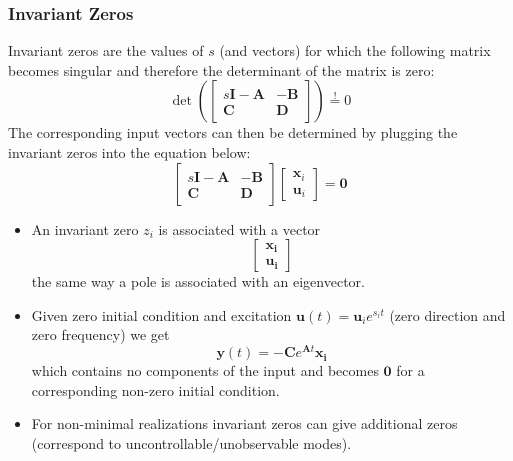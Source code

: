\subsubsection{Invariant Zeros}

Invariant zeros are the values of $s$ (and vectors) for which the following matrix becomes singular and therefore the determinant of the matrix is zero:
\begin{equation*}
    \det \left(\begin{bmatrix}
            s\mathbf{I}-\mathbf{A} & -\mathbf{B} \\
            \mathbf{C}             & \mathbf{D}
        \end{bmatrix}\right) \overset{!}{=}0
\end{equation*}
The corresponding input vectors can then be determined by plugging the invariant zeros into the equation below:
\begin{equation*}
    \begin{bmatrix}
        s\mathbf{I}-\mathbf{A} & -\mathbf{B} \\
        \mathbf{C}             & \mathbf{D}
    \end{bmatrix}
    \begin{bmatrix}
        \mathbf{x}_i \\
        \mathbf{u}_i
    \end{bmatrix}=\mathbf{0}
\end{equation*}


\begin{itemize}
    \item An invariant zero $z_i$ is associated with a vector
          \begin{equation*}
              \begin{bmatrix}
                  \mathbf{x_i} \\
                  \mathbf{u_i}
              \end{bmatrix}
          \end{equation*}
          the same way a pole is associated with an eigenvector.
    \item Given zero initial condition and excitation $\mathbf{u}(t)=\mathbf{u}_i e^{s_i t}$ (zero direction and zero frequency) we get
          \begin{equation*}
              \mathbf{y}(t)=-\mathbf{C}e^{\mathbf{A}t}\mathbf{x_i}
          \end{equation*} which contains no components of the input and becomes $\mathbf{0}$ for a corresponding non-zero initial condition.    %
    \item For non-minimal realizations invariant zeros can give additional zeros (correspond to uncontrollable/unobservable modes).
\end{itemize}


